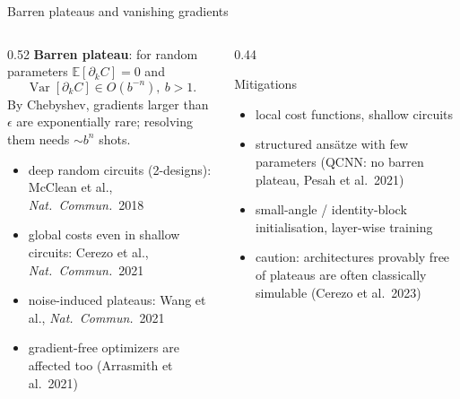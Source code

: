 \documentclass[aspectratio=169,11pt]{beamer}
\newcommand{\key}[1]{{\color{qdark}\textbf{#1}}}
\begin{document}
\begin{frame}[label=fBP]{Barren plateaus and vanishing gradients}
  \begin{columns}[T]
    \begin{column}{0.52\textwidth}
      \small
      \key{Barren plateau}: for random parameters $\mathbb E[\partial_kC] = 0$ and
      \[ \operatorname{Var}[\partial_kC] \in O(b^{-n}),\ b > 1. \]
      By Chebyshev, gradients larger than $\epsilon$ are exponentially rare; resolving them needs $\sim b^n$ shots.
      \begin{itemize}\itemsep1pt\scriptsize
        \item deep random circuits (2-designs): McClean et al., \emph{Nat.\ Commun.}\ 2018
        \item global costs even in shallow circuits: Cerezo et al., \emph{Nat.\ Commun.}\ 2021
        \item noise-induced plateaus: Wang et al., \emph{Nat.\ Commun.}\ 2021
        \item gradient-free optimizers are affected too (Arrasmith et al.\ 2021)
      \end{itemize}
    \end{column}
    \begin{column}{0.44\textwidth}
      \begin{block}{Mitigations}
        \scriptsize
        \begin{itemize}\itemsep1pt
          \item local cost functions, shallow circuits
          \item structured ans\"atze with few parameters (QCNN: no barren plateau, Pesah et al.\ 2021)
          \item small-angle / identity-block initialisation, layer-wise training
          \item caution: architectures provably free of plateaus are often classically simulable (Cerezo et al.\ 2023)
        \end{itemize}
      \end{block}
    \end{column}
  \end{columns}
\end{frame}
\end{document}
